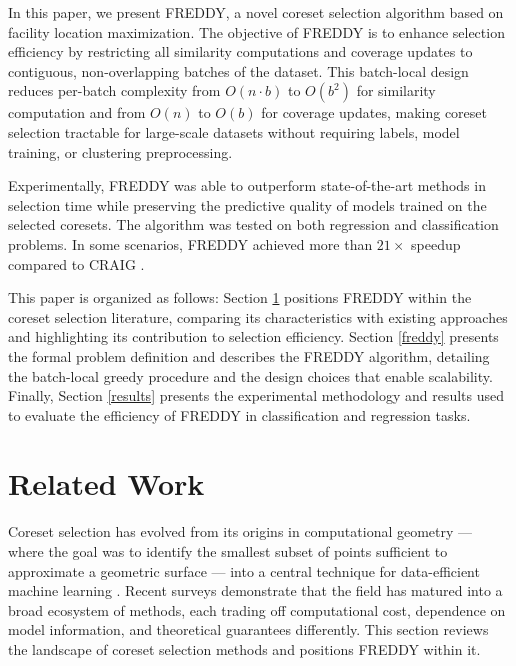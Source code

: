 \documentclass{article}
\begin{document}
In this paper, we present FREDDY, a novel coreset selection algorithm based on facility location maximization. The objective of FREDDY is to enhance selection efficiency by restricting all similarity computations and coverage updates to contiguous, non-overlapping batches of the dataset. This batch-local design reduces per-batch complexity from $O(n \cdot b)$ to $O(b^2)$ for similarity computation and from $O(n)$ to $O(b)$ for coverage updates, making coreset selection tractable for large-scale datasets without requiring labels, model training, or clustering preprocessing.

Experimentally, FREDDY was able to outperform state-of-the-art methods in selection time while preserving the predictive quality of models trained on the selected coresets. The algorithm was tested on both regression and classification problems. In some scenarios, FREDDY achieved more than $21\times$ speedup compared to CRAIG \cite{Mirzasoleiman2020Coresets}.

This paper is organized as follows: Section \ref{related-work} positions FREDDY within the coreset selection literature, comparing its characteristics with existing approaches and highlighting its contribution to selection efficiency. Section \ref{freddy} presents the formal problem definition and describes the FREDDY algorithm, detailing the batch-local greedy procedure and the design choices that enable scalability. Finally, Section \ref{results} presents the experimental methodology and results used to evaluate the efficiency of FREDDY in classification and regression tasks.


\section{Related Work}\label{related-work}

Coreset selection has evolved from its origins in computational geometry — where the goal was to identify the smallest subset of points sufficient to approximate a geometric surface \cite{HarPeled2004OnCoresets, har2005smaller} — into a central technique for data-efficient machine learning \cite{Huggins2016, MoseretalSurvey}.
Recent surveys \cite{MoseretalSurvey, Weinreich2025Survey} demonstrate that the field has matured into a broad ecosystem of methods, each trading off computational cost, dependence on model information, and theoretical guarantees differently.
This section reviews the landscape of coreset selection methods and positions FREDDY within it.
\end{document}
